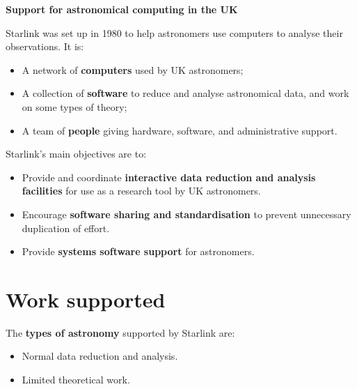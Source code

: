 \renewcommand{\thepage}{\arabic{page}}
\setcounter{page}{1}

\begin{center}
{\large\bf Support for astronomical computing in the UK}
\end{center}

\vspace*{5mm}

Starlink was set up in 1980 to help astronomers use computers to analyse their
observations.
It is:

\begin{itemize}
\item A network of {\bf computers} used by UK astronomers; 
\item A collection of {\bf software} to reduce and analyse astronomical data,
and work on some types of theory;
\item A team of {\bf people} giving hardware, software, and administrative
support. 
\end{itemize}

Starlink's main objectives are to:

\begin{itemize}
\item Provide and coordinate {\bf interactive data reduction and analysis
facilities} for use as a research tool by UK astronomers.
\item Encourage {\bf software sharing and standardisation} to prevent
unnecessary duplication of effort.
\item Provide {\bf systems software support} for astronomers.
\end{itemize}

\newpage

\section*{Work supported}

The {\bf types of astronomy} supported by Starlink are:

\begin{itemize}
\item Normal data reduction and analysis.
\item Limited theoretical work.
\end{itemize}

